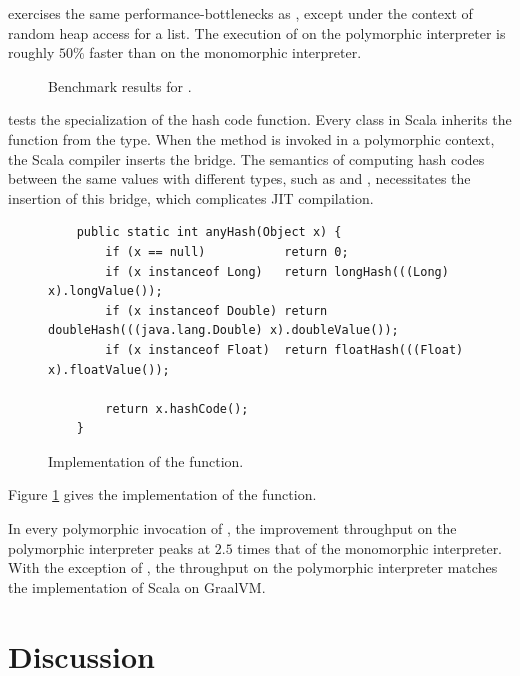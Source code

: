  exercises the same performance-bottlenecks as , except under the context of random heap access for a list.
The execution of  on the polymorphic interpreter is roughly $50\%$ faster than on the monomorphic interpreter.

\begin{figure}[!htb]
	\centering
	
	\caption{Benchmark results for .}
\end{figure}

 tests the specialization of the hash code function.
Every class in Scala inherits the  function from the  type.
When the  method is invoked in a polymorphic context, the Scala compiler inserts the  bridge.
The semantics of computing hash codes between the same values with different types, such as  and , necessitates the insertion of this bridge, which complicates JIT compilation.

\begin{figure}[!htb]
\begin{verbatim}
	public static int anyHash(Object x) {
		if (x == null)           return 0;
		if (x instanceof Long)   return longHash(((Long) x).longValue());
		if (x instanceof Double) return doubleHash(((java.lang.Double) x).doubleValue());
		if (x instanceof Float)  return floatHash(((Float) x).floatValue());
		
		return x.hashCode();
	}
\end{verbatim}
\caption{Implementation of the  function.}
\label{impl:anyHash}
\end{figure}


Figure \ref{impl:anyHash} gives the implementation of the  function.

In every polymorphic invocation of , the improvement throughput on the polymorphic interpreter peaks at $2.5$ times that of the monomorphic interpreter.
With the exception of , the throughput on the polymorphic interpreter matches the implementation of Scala on GraalVM.

\section{Discussion}

